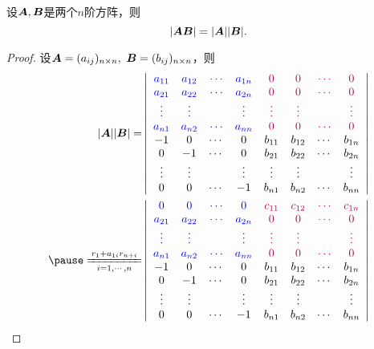 \begin{frame}
\begin{dingli}
  设$\boldsymbol{A},\boldsymbol{B}$是两个$n$阶方阵，则
  $$
  |\boldsymbol{A}\boldsymbol{B}| = |\boldsymbol{A}||\boldsymbol{B}|.
  $$
\end{dingli} \pause 
\begin{proof}

  设$\boldsymbol{A}=(a_{ij})_{n\times n}, ~\boldsymbol{B}=(b_{ij})_{n\times n}$，则
  $$
  \begin{aligned}
    |\MA||\MB| =& \left|
      \begin{array}{cccccccc}
        \blue{a_{11}} & \blue{a_{12}} & \blue{\cd} &  \blue{a_{1n}} & \purple{0} & \purple{0} & \purple{\cd} & \purple{0}\\
        \blue{a_{21}} & \blue{a_{22}} & \blue{\cd} &  \blue{a_{2n}} & \purple{0} & \purple{0} & \purple{\cd} & \purple{0}\\
        \blue{\vd}   & \blue{\vd}   &     & \blue{\vd}    & \purple{\vd} & \purple{\vd} & & \purple{\vd}\\
        \blue{a_{n1}} & \blue{a_{n2}} & \blue{\cd} &  \blue{a_{nn}} & \purple{0} & \purple{0} & \purple{\cd} & \purple{0}\\
        -1    & 0     & \cd &   0    & b_{11} & b_{12} & \cd & b_{1n} \\
        0 & -1 & \cd & 0& b_{21} & b_{22} & \cd & b_{2n} \\
        \vd&\vd & & \vd &  \vd  &\vd &  & \vd   \\
        0 & 0 & \cd & -1 & b_{n1} & b_{n2} &\cd     & b_{nn}
      \end{array}
    \right|\\ \pause 
    \xlongequal[i=1,\cd,n]{r_1+a_{1i}r_{n+i}}&
    \left|
      \begin{array}{cccccccc}
        \blue{0} & \blue{0} & \blue{\cd} &  \blue{0} & \purple{c_{11}} & \purple{c_{12}} & \purple{\cd} & \purple{c_{1n}}\\
        \blue{a_{21}} & \blue{a_{22}} & \blue{\cd} &  \blue{a_{2n}} & \purple{0} & \purple{0} & \purple{\cd} & \purple{0}\\
        \blue{\vd}   & \blue{\vd}   &     & \blue{\vd}    & \purple{\vd} & \purple{\vd} & & \purple{\vd}\\
        \blue{a_{n1}} & \blue{a_{n2}} & \blue{\cd} &  \blue{a_{nn}} & \purple{0} & \purple{0} & \purple{\cd} & \purple{0}\\
        -1    & 0     & \cd &   0    & b_{11} & b_{12} & \cd & b_{1n} \\
        0 & -1 & \cd & 0& b_{21} & b_{22} & \cd & b_{2n} \\
        \vd&\vd & & \vd &  \vd  &\vd &  & \vd   \\
        0 & 0 & \cd & -1 & b_{n1} & b_{n2} &\cd     & b_{nn}
      \end{array}
    \right|
  \end{aligned}
  $$
\end{proof} 
\end{frame}

